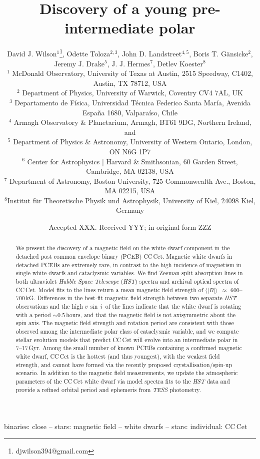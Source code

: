 \documentclass[fleqn,usenatbib]{mnras}
\title[A pre-intermediate polar]{Discovery of a young pre-intermediate polar}
\author[Wilson et al.]{David J. Wilson$^{1}$\thanks{djwilson394@gmail.com}, Odette Toloza$^{2,3}$, John D. Landstreet$^{4,5}$,
Boris T. G{\"a}nsicke$^{2}$, \newauthor Jeremy J.  Drake$^{5}$, J. J. Hermes$^{7}$, Detlev Koester$^{8}$  \medskip\\
$^{1}$ McDonald Observatory, University of Texas at Austin, 2515 Speedway, C1402, Austin, TX 78712, USA \\ 
$^{2}$ Department of Physics, University of Warwick, Coventry CV4 7AL, UK \\
$^{3}$ Departamento de Física, Universidad Técnica Federico Santa María, Avenida España 1680, Valparaíso, Chile\\
$^{4}$ Armagh Observatory \& Planetarium, Armagh, BT61 9DG, Northern Ireland, and  \\
$^{5}$ Department of Physics \& Astronomy, University of Western Ontario, London, ON N6G 1P7 \\
$^{6}$ Center for Astrophysics | Harvard \& Smithsonian, 60 Garden Street, Cambridge, MA 02138, USA\\
$^{7}$ Department of Astronomy, Boston University, 725 Commonwealth Ave., Boston, MA 02215, USA\\
$^{8}$Institut f{\"u}r Theoretische Physik und Astrophysik, University of Kiel, 24098 Kiel, Germany 
}
\date{Accepted XXX. Received YYY; in original form ZZZ}
\newcommand{\bs}{\ensuremath{\langle \vert B \vert \rangle}}
\newcommand{\vsini}{\ensuremath{v\,\sin\,i}}
\begin{document}
\label{firstpage}
\pagerange{\pageref{firstpage}--\pageref{lastpage}}
\maketitle

\begin{abstract}
We present the discovery of a magnetic field on the white dwarf component in the detached post common envelope binary (PCEB) CC\,Cet. Magnetic white dwarfs in detached PCEBs are extremely rare, in contrast to the high incidence of magnetism in single white dwarfs and cataclysmic variables. We find Zeeman-split absorption lines in both ultraviolet \textit{Hubble Space Telescope} (\textit{HST}) spectra and archival optical spectra of CC\,Cet. Model fits to the lines return a mean magnetic field strength of  \bs\ $\approx$ 600--700\,kG. Differences in the best-fit magnetic field strength between two separate \textit{HST} observations and the high \vsini\ of the lines indicate that the white dwarf is  rotating with a period $\sim0.5$\,hours, and that the magnetic field is not axisymmetric about the spin axis. The magnetic field strength and rotation period are consistent with those observed among the intermediate polar class of cataclysmic variable, and we compute stellar evolution models that predict CC\,Cet will evolve into an intermediate polar in 7--17\,Gyr. Among the small number of known PCEBs containing a confirmed magnetic white dwarf, CC\,Cet is the hottest (and thus youngest), with the weakest field strength, and cannot have formed via the recently proposed crystallisation/spin-up scenario. In addition to the magnetic field measurements, we update the atmospheric parameters of the CC\,Cet white dwarf via model spectra fits to the \textit{HST} data and provide a refined orbital period and ephemeris from \textit{TESS} photometry.       
\end{abstract}

\begin{keywords}
binaries: close -- stars: magnetic field -- white dwarfs -- stars: individual: CC\,Cet
\end{keywords}



\end{document}
